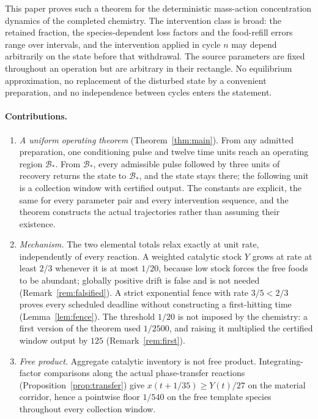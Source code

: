 \documentclass[11pt,a4paper]{article}
\theoremstyle{plain}
\theoremstyle{definition}
\theoremstyle{remark}
\newcommand{\Bstar}{\mathcal B_*}
\begin{document}
This paper proves such a theorem for the deterministic mass-action concentration dynamics of the completed chemistry. The intervention class is broad: the retained fraction, the species-dependent loss factors and the food-refill errors range over intervals, and the intervention applied in cycle $n$ may depend arbitrarily on the state before that withdrawal. The source parameters are fixed throughout an operation but are arbitrary in their rectangle. No equilibrium approximation, no replacement of the disturbed state by a convenient preparation, and no independence between cycles enters the statement.

\paragraph{Contributions.}
\begin{enumerate}[label=(\roman*)]
\item \emph{A uniform operating theorem} (Theorem~\ref{thm:main}). From any admitted preparation, one conditioning pulse and twelve time units reach an operating region $\Bstar$. From $\Bstar$, every admissible pulse followed by three units of recovery returns the state to $\Bstar$, and the state stays there; the following unit is a collection window with certified output. The constants are explicit, the same for every parameter pair and every intervention sequence, and the theorem constructs the actual trajectories rather than assuming their existence.
\item \emph{Mechanism.} The two elemental totals relax exactly at unit rate, independently of every reaction. A weighted catalytic stock $Y$ grows at rate at least $2/3$ whenever it is at most $1/20$, because low stock forces the free foods to be abundant; globally positive drift is false and is not needed (Remark~\ref{rem:falsified}). A strict exponential fence with rate $3/5<2/3$ proves every scheduled deadline without constructing a first-hitting time (Lemma~\ref{lem:fence}). The threshold $1/20$ is not imposed by the chemistry: a first version of the theorem used $1/2500$, and raising it multiplied the certified window output by $125$ (Remark~\ref{rem:first}).
\item \emph{Free product.} Aggregate catalytic inventory is not free product. Integrating-factor comparisons along the actual phase-transfer reactions (Proposition~\ref{prop:transfer}) give $x(t+1/35)\ge Y(t)/27$ on the material corridor, hence a pointwise floor $1/540$ on the free template species throughout every collection window.

\end{enumerate}
\end{document}
